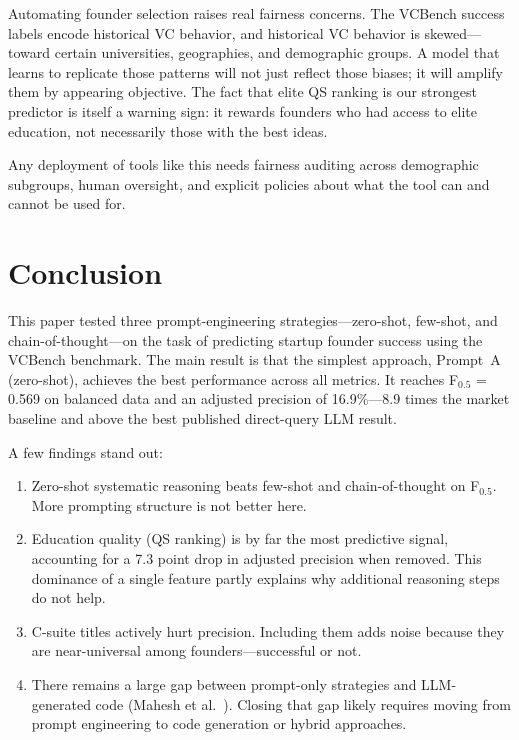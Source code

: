 \documentclass{article}
\begin{document}
Automating founder selection raises real fairness concerns. The VCBench success labels encode historical VC behavior, and historical VC behavior is skewed---toward certain universities, geographies, and demographic groups. A model that learns to replicate those patterns will not just reflect those biases; it will amplify them by appearing objective. The fact that elite QS ranking is our strongest predictor is itself a warning sign: it rewards founders who had access to elite education, not necessarily those with the best ideas.

Any deployment of tools like this needs fairness auditing across demographic subgroups, human oversight, and explicit policies about what the tool can and cannot be used for.

\section{Conclusion}

This paper tested three prompt-engineering strategies---zero-shot, few-shot, and chain-of-thought---on the task of predicting startup founder success using the VCBench benchmark. The main result is that the simplest approach, Prompt~A (zero-shot), achieves the best performance across all metrics. It reaches F$_{0.5}$ = 0.569 on balanced data and an adjusted precision of 16.9\%---8.9 times the market baseline and above the best published direct-query LLM result.

A few findings stand out:

\begin{enumerate}
  \item Zero-shot systematic reasoning beats few-shot and chain-of-thought on F$_{0.5}$. More prompting structure is not better here.
  \item Education quality (QS ranking) is by far the most predictive signal, accounting for a 7.3 point drop in adjusted precision when removed. This dominance of a single feature partly explains why additional reasoning steps do not help.
  \item C-suite titles actively hurt precision. Including them adds noise because they are near-universal among founders---successful or not.
  \item There remains a large gap between prompt-only strategies and LLM-generated code (Mahesh et al.~\cite{mahesh2026stochastic}). Closing that gap likely requires moving from prompt engineering to code generation or hybrid approaches.
\end{enumerate}
\end{document}
